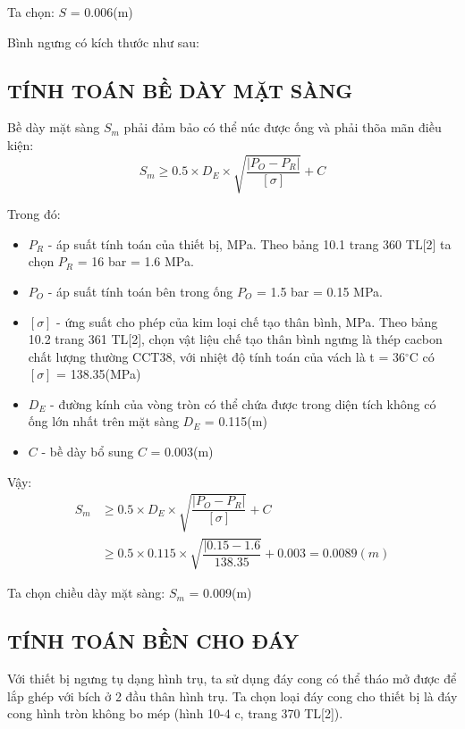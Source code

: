Ta chọn: $S$ = 0.006(m)

Bình ngưng có kích thước như sau:

\subsection{TÍNH TOÁN BỀ DÀY MẶT SÀNG}
Bề dày mặt sàng $S_{m}$ phải đảm bảo có thể núc được ống và phải thõa mãn điều kiện:
\begin{equation*}
	S_{m} \geq 0.5\times D_{E}\times \sqrt{\dfrac{|P_{O} - P_{R}|}{[\sigma]}} + C
\end{equation*}

Trong đó:
\begin{itemize}
	\item $P_{R}$ - áp suất tính toán của thiết bị, MPa. Theo bảng 10.1 trang 360 TL[2] ta chọn $P_{R}$ = 16 bar = 1.6  MPa.
	\item $P_{O}$ - áp suất tính toán bên trong ống $P_{O}$ = 1.5 bar = 0.15 MPa.
	\item $[\sigma]$ - ứng suất cho phép của kim loại chế tạo thân bình, MPa. Theo bảng 10.2 trang 361 TL[2], chọn vật liệu chế tạo thân bình ngưng là thép cacbon chất lượng thường CCT38, với nhiệt độ tính toán của vách là t = 36$^{\circ}$C có $[\sigma]$ = 138.35(MPa)	
	\item $D_{E}$ - đường kính của vòng tròn có thể chứa được trong diện tích không có ống lớn nhất trên mặt sàng $D_{E}$ = 0.115(m)
	\item $C$ - bề dày bổ sung $C$ = 0.003(m)
\end{itemize}

Vậy:
\begin{equation*}
\begin{split}
		S_{m} &\geq 0.5\times D_{E}\times \sqrt{\dfrac{|P_{O} - P_{R}|}{[\sigma]}} + C\\
		&\geq 0.5 \times 0.115 \times \sqrt{\dfrac{|0.15-1.6}{138.35}} + 0.003 = 0.0089(m)
\end{split}
\end{equation*}

Ta chọn chiều dày mặt sàng: $S_{m}$ = 0.009(m)

\subsection{TÍNH TOÁN BỀN CHO ĐÁY}
Với thiết bị ngưng tụ dạng hình trụ, ta sử dụng đáy cong có thể tháo mở được để lắp ghép với bích ở 2 đầu thân hình trụ. Ta chọn loại đáy cong cho thiết bị là đáy cong hình tròn không bo mép (hình 10-4 c, trang 370 TL[2]).

